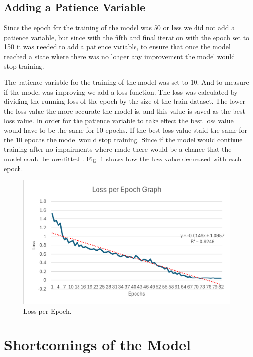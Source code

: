 \documentclass[conference]{IEEEtran}
\begin{document}
\subsection{Adding a Patience Variable}

Since the epoch for the training of the model was 50 or less we did not add a patience variable, but since with the fifth and final iteration with the epoch set to 150 it was needed to add a patience variable, to ensure that once the model reached a state where there was no longer any improvement the model would stop training.

The patience variable for the training of the model was set to 10. And to measure if the model was improving we add a loss function. The loss was calculated by dividing the running loss of the epoch by the size of the train dataset. The lower the loss value the more accurate the model is, and this value is saved as the best loss value. In order for the patience variable to take effect the best loss value would have to be the same for 10 epochs. If the best loss value staid the same for the 10 epochs the model would stop training. Since if the model would continue training after no impairments where made there would be a chance that the model could be overfitted \cite{b5}. Fig. \ref{fig5} shows how the loss value decreased with each epoch.

\begin{figure}[h]
    \centering
    \includegraphics[width=\linewidth]{Loss_per_Epoch_Graph.png}
    \caption{Loss per Epoch.}
    \label{fig5}
\end{figure}

\section{Shortcomings of the Model}
\end{document}
